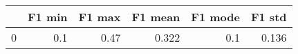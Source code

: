 \begin{tabular}{lrrrrr}
\toprule
{} &  F1 min &  F1 max &  F1 mean &  F1 mode &  F1 std \\
\midrule
0 &     0.1 &    0.47 &    0.322 &      0.1 &   0.136 \\
\bottomrule
\end{tabular}

